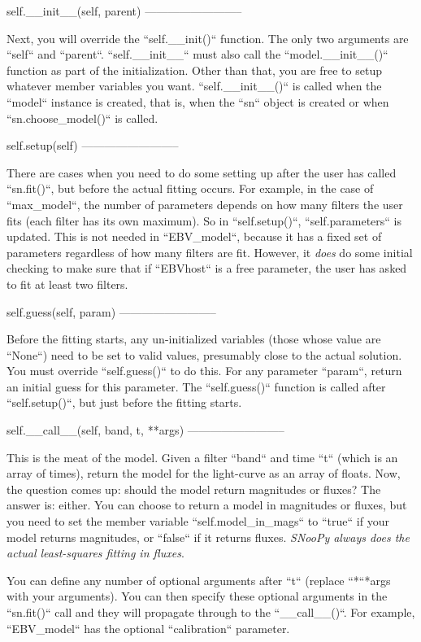 self.__init__(self, parent)
--------------------------

Next, you will override the ``self.__init()`` function. The
only two arguments are ``self`` and ``parent``. ``self.__init__``
must also call the ``model.__init__()`` function as part
of the initialization. Other than that, you are free to setup whatever
member variables you want. ``self.__init__()`` is called
when the ``model`` instance is created, that is, when the ``sn``
object is created or when ``sn.choose_model()`` is called.


self.setup(self)
--------------------------

There are cases when you need to do some setting up after the user
has called ``sn.fit()``, but before the actual fitting occurs.
For example, in the case of ``max_model``, the number of parameters
depends on how many filters the user fits (each filter has its own
maximum). So in ``self.setup()``, ``self.parameters`` is
updated. This is not needed in ``EBV_model``, because it has
a fixed set of parameters regardless of how many filters are fit.
However, it \emph{does} do some initial checking to make sure that
if ``EBVhost`` is a free parameter, the user has asked to fit
at least two filters.


self.guess(self, param)
--------------------------

Before the fitting starts, any un-initialized variables (those whose
value are ``None``) need to be set to valid values, presumably
close to the actual solution. You must override ``self.guess()``
to do this. For any parameter ``param``, return an initial guess
for this parameter. The ``self.guess()`` function is called after
``self.setup()``, but just before the fitting starts.


self.__call__(self, band, t, {*}{*}args)
--------------------------

This is the meat of the model. Given a filter ``band`` and time
``t`` (which is an array of times), return the model for the
light-curve as an array of floats. Now, the question comes up: should
the model return magnitudes or fluxes? The answer is: either. You
can choose to return a model in magnitudes or fluxes, but you need
to set the member variable ``self.model_in_mags`` to ``true``
if your model returns magnitudes, or ``false`` if it returns
fluxes. \emph{SNooPy always does the actual least-squares fitting
in fluxes}.

You can define any number of optional arguments after ``t`` (replace
``{*``{*}args} with your arguments). You can then specify these
optional arguments in the ``sn.fit()`` call and they will propagate
through to the ``__call__()``. For example, ``EBV_model``
has the optional ``calibration`` parameter.


